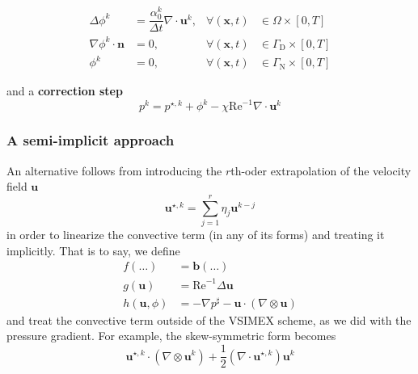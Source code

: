 \documentclass[]{scrartcl}
\newcommand{\bs}[1]{\boldsymbol{#1}}
\begin{document}
\begin{align}
\Delta \phi^{k} &= \dfrac{\alpha_0^k}{\Delta t} \nabla \cdot \bs{u}^{k},  &\forall (\bs{x}, t) &\in \Omega \times \left[0, T \right] \label{Eqn:VSIMEXProjectionStep} \\
\nabla \phi^{k} \cdot \bs{n} &= 0, &\forall (\bs{x}, t) &\in \Gamma_\textrm{D} \times \left[0, T \right] \nonumber \\
\phi^{k} &= 0, &\forall\left(\bs{x}, t\right) &\in \Gamma_\textrm{N} \times \left[0, T \right] \nonumber
\end{align}

and a \textbf{correction step}
\begin{equation}\label{Eqn:VSIMEXCorrectionStep}
	p^{k} = p^{\star, k} + \phi^{k} - \chi\textrm{Re}^{-1} \nabla \cdot \bs{u}^{k}
\end{equation}
\subsubsection{A semi-implicit approach}\label{Sec:SemiImplicit}
An alternative follows from introducing the $r$th-oder extrapolation of the velocity field $\bs{u}$ 
\begin{equation*}
\bs{u}^{\star, k} = \sum_{j=1}^{r} \eta_j \bs{u}^{k-j}
\end{equation*}
in order to linearize the convective term (in any of its forms) and treating it implicitly. That is to say, we define
\begin{equation*}
\begin{aligned}
f(\dots) &= \bs{b}(\dots) \\
g(\bs{u}) &= \textrm{Re}^{-1} \Delta \bs{u}\\
h(\bs{u}, \phi) &= -\nabla p^\sharp - \bs{u} \cdot (\nabla \otimes \bs{u})
\end{aligned}
\end{equation*}
and treat the convective term outside of the VSIMEX scheme, as we did with the pressure gradient. For example, the skew-symmetric form becomes
\begin{equation*}
	\bs{u}^{\star, k} \cdot (\nabla \otimes \bs{u}^{k}) + \dfrac{1}{2} (\nabla \cdot \bs{u}^{\star, k})\bs{u}^{k}
\end{equation*}
\end{document}
